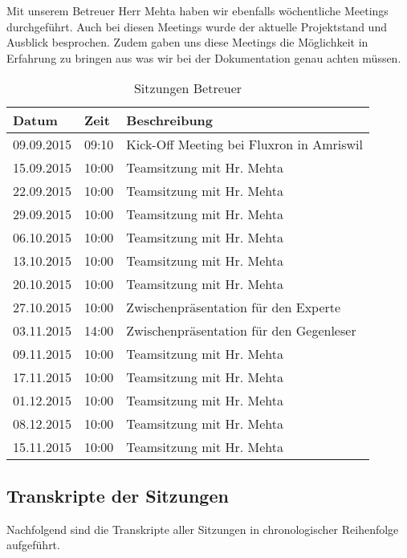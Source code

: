 Mit unserem Betreuer Herr Mehta haben wir ebenfalls wöchentliche Meetings durchgeführt. Auch bei diesen Meetings wurde der aktuelle Projektstand und Ausblick besprochen. Zudem gaben uns diese Meetings die Möglichkeit in Erfahrung zu bringen aus was wir bei der Dokumentation genau achten müssen.

\begin{table}[H]
\begin{tabularx}{\textwidth}{ l | l | X}
\textbf{Datum}& \textbf{Zeit} & \textbf{Beschreibung}\\ \hline
09.09.2015 & 09:10 & Kick-Off Meeting bei Fluxron in Amriswil\\ \hline
15.09.2015 & 10:00 & Teamsitzung mit Hr. Mehta\\ \hline
22.09.2015 & 10:00 & Teamsitzung mit Hr. Mehta\\ \hline
29.09.2015 & 10:00 & Teamsitzung mit Hr. Mehta\\ \hline
06.10.2015 & 10:00 & Teamsitzung mit Hr. Mehta\\ \hline
13.10.2015 & 10:00 & Teamsitzung mit Hr. Mehta\\ \hline
20.10.2015 & 10:00 & Teamsitzung mit Hr. Mehta\\ \hline
27.10.2015 & 10:00 & Zwischenpräsentation für den Experte\\ \hline
03.11.2015 & 14:00 & Zwischenpräsentation für den Gegenleser\\ \hline
09.11.2015 & 10:00 & Teamsitzung mit Hr. Mehta\\ \hline
17.11.2015 & 10:00 & Teamsitzung mit Hr. Mehta\\ \hline
01.12.2015 & 10:00 & Teamsitzung mit Hr. Mehta\\ \hline
08.12.2015 & 10:00 & Teamsitzung mit Hr. Mehta\\ \hline
15.11.2015 & 10:00 & Teamsitzung mit Hr. Mehta\\ \hline
\end{tabularx}
\caption{Sitzungen Betreuer}
\end{table}

\subsection{Transkripte der Sitzungen}
\label{sub:sitzungs_transkripte}

Nachfolgend sind die Transkripte aller Sitzungen in chronologischer Reihenfolge aufgeführt.


